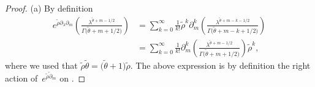 \documentclass[10pt,a4paper]{article}
\numberwithin{equation}{section}
\begin{document}
\begin{proof}
(a)
By definition
\begin{align*}
e^{\widetilde{\rho}\partial_\lambda\partial_m}
\left(
\frac{\lambda^{\widetilde{\theta}+m-1/2}}{
\Gamma\big(\widetilde{\theta}+m+1/2\big)} \right) &=
\sum_{k=0}^\infty
\frac{1}{k!} \widetilde{\rho}^k \partial_m^k
\left(
\frac{\lambda^{\widetilde{\theta}+m-k-1/2}}{
\Gamma\big(\widetilde{\theta}+m-k+1/2\big)} \right) \\
&=
\sum_{k=0}^\infty
\frac{1}{k!} \partial_m^k
\left(
\frac{\lambda^{\widetilde{\theta}+m-1/2}}{
\Gamma\big(\widetilde{\theta}+m+1/2\big)} \right)
 \widetilde{\rho}^k,
\end{align*}
where we used that
$\widetilde{\rho} \widetilde{\theta} =
\big(\widetilde{\theta} +1\big) \widetilde{\rho}
$. The above expression is by definition the right action of~$e^{\widetilde{\rho} \overleftarrow{\partial}_m} $ on
.


\end{proof}
\end{document}
